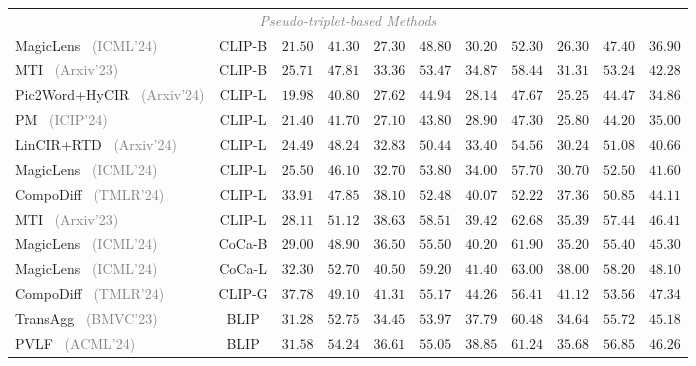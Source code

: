 \begin{table*}
\begin{tabular}{l|c|cc|cc|cc|cc|c}
    \multicolumn{11}{c}{\textit{\textcolor{gray}{Pseudo-triplet-based Methods}}} \\
    MagicLens~\cite{zhang2024magiclens} \footnotesize{\textcolor{gray}{(ICML'24)}} & CLIP-B & $21.50$ & $41.30$ & $27.30$ & $48.80$ & $30.20$ & $52.30$ & $26.30$ & $47.40$ & $36.90$\\
    MTI~\cite{mti} \footnotesize{\textcolor{gray}{(Arxiv'23)}} & CLIP-B & $25.71$ & $47.81$ & $33.36$ & $53.47$ & $34.87$ & $58.44$ & $31.31$ & $53.24$ & $42.28$ \\
    Pic2Word+HyCIR~\cite{hycir} \footnotesize{\textcolor{gray}{(Arxiv'24)}} & CLIP-L & $19.98$ & $40.80$ & $27.62$ & $44.94$ & $28.14$ & $47.67$ & $25.25$ & $44.47$ & $34.86$ \\
    PM~\cite{pm} \footnotesize{\textcolor{gray}{(ICIP'24)}} & CLIP-L & $21.40$ & $41.70$ & $27.10$ & $43.80$ & $28.90$ & $47.30$ & $25.80$ & $44.20$ & $35.00$ \\
    LinCIR+RTD~\cite{rtd} \footnotesize{\textcolor{gray}{(Arxiv'24)}} & CLIP-L & $24.49$ & $48.24$ & $32.83$ & $50.44$ & $33.40$ & $54.56$ & $30.24$ & $51.08$ & $40.66$ \\
    MagicLens~\cite{zhang2024magiclens} \footnotesize{\textcolor{gray}{(ICML'24)}} & CLIP-L & $25.50$ & $46.10$ & $32.70$ & $53.80$ & $34.00$ & $57.70$ & $30.70$ & $52.50$ & $41.60$\\
    CompoDiff~\cite{compodiff} \footnotesize{\textcolor{gray}{(TMLR'24)}} & CLIP-L & $33.91$ & $47.85$ & $38.10$ & $52.48$ & $40.07$ & $52.22$ & $37.36$ & $50.85$ & $44.11$\\
    MTI~\cite{mti} \footnotesize{\textcolor{gray}{(Arxiv'23)}} & CLIP-L & $28.11$ & $51.12$ & $38.63$ & $58.51$ & $39.42$ & $62.68$ & $35.39$ & $57.44$ & $46.41$ \\
    MagicLens~\cite{zhang2024magiclens} \footnotesize{\textcolor{gray}{(ICML'24)}} & CoCa-B & $29.00$ & $48.90$ & $36.50$ & $55.50$ & $40.20$ & $61.90$ & $35.20$ & $55.40$ & $45.30$\\
    MagicLens~\cite{zhang2024magiclens} \footnotesize{\textcolor{gray}{(ICML'24)}} & CoCa-L & $32.30$ & $52.70$ & $40.50$ & $59.20$ & $41.40$ & $63.00$ & $38.00$ & $58.20$ & $48.10$\\
    CompoDiff~\cite{compodiff} \footnotesize{\textcolor{gray}{(TMLR'24)}} & CLIP-G & $37.78$ & $49.10$ & $41.31$ & $55.17$ & $44.26$ & $56.41$ & $41.12$ & $53.56$ & $47.34$\\
    TransAgg~\cite{transagg} \footnotesize{\textcolor{gray}{(BMVC'23)}} & BLIP & $31.28$ & $52.75$ & $34.45$ & $53.97$ & $37.79$ & $60.48$ & $34.64$ & $55.72$ & $45.18$ \\
    PVLF~\cite{pvlf} \footnotesize{\textcolor{gray}{(ACML'24)}} & BLIP & $31.58$ & $54.24$ & $36.61$ & $55.05$ & $38.85$ & $61.24$ & $35.68$ & $56.85$ & $46.26$ \\
    

\end{tabular}
\end{table*}
